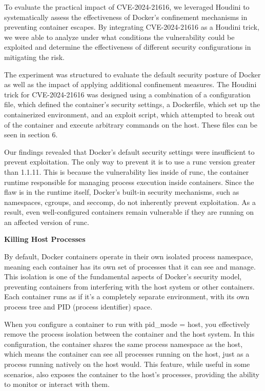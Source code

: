 To evaluate the practical impact of CVE-2024-21616, we leveraged Houdini to systematically assess the effectiveness of Docker’s confinement mechanisms in preventing container escapes. By integrating CVE-2024-21616 as a Houdini trick, we were able to analyze under what conditions the vulnerability could be exploited and determine the effectiveness of different security configurations in mitigating the risk.

The experiment was structured to evaluate the default security posture of Docker as well as the impact of applying additional confinement measures. The Houdini trick for CVE-2024-21616 was designed using a combination of a configuration file, which defined the container’s security settings, a Dockerfile, which set up the containerized environment, and an exploit script, which attempted to break out of the container and execute arbitrary commands on the host. These files can be seen in section 6.

Our findings revealed that Docker’s default security settings were insufficient to prevent exploitation. The only way to prevent it is to use a runc version greater than 1.1.11. This is because the vulnerability lies inside of runc, the container runtime responsible for managing process execution inside containers. Since the flaw is in the runtime itself, Docker’s built-in security mechanisms, such as namespaces, cgroups, and seccomp, do not inherently prevent exploitation. As a result, even well-configured containers remain vulnerable if they are running on an affected version of runc.


\noindent\textbf{Killing Host Processes}

By default, Docker containers operate in their own isolated process namespace, meaning each container has its own set of processes that it can see and manage. This isolation is one of the fundamental aspects of Docker's security model, preventing containers from interfering with the host system or other containers. Each container runs as if it's a completely separate environment, with its own process tree and PID (process identifier) space.

When you configure a container to run with pid\_mode = host, you effectively remove the process isolation between the container and the host system. In this configuration, the container shares the same process namespace as the host, which means the container can see all processes running on the host, just as a process running natively on the host would. This feature, while useful in some scenarios, also exposes the container to the host's processes, providing the ability to monitor or interact with them.

